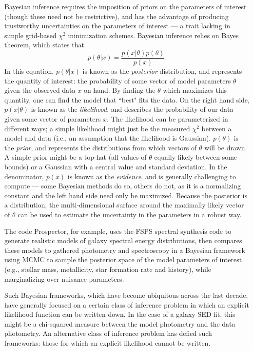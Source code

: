 \documentclass[twocolumn]{aastex631}
\begin{document}
Bayesian inference requires the imposition of priors on the parameters of interest (though these need not be restrictive), and has the advantage of producing trustworthy uncertainties on the parameters of interest --- a trait lacking in simple grid-based $\chi^2$ minimization schemes. Bayesian inference relies on Bayes theorem, which states that 
\begin{equation}\label{bayes}
    p(\theta|x) = \frac{p(x|\theta)p(\theta)}{p(x)}.
\end{equation}
In this equation, $p(\theta|x)$ is known as the \textit{posterior} distribution, and represents the quantity of interest: the probability of some vector of model parameters $\theta$ given the observed data $x$ on hand. By finding the $\theta$ which maximizes this quantity, one can find the model that ``best" fits the data. On the right hand side, $p(x|\theta)$ is known as the \textit{likelihood}, and describes the probability of our data given some vector of parameters $x$. The likelihood can be parameterized in different ways; a simple likelihood might just be the measured $\chi^2$ between a model and data (i.e., an assumption that the likelihood is Gaussian). $p(\theta)$ is the \textit{prior}, and represents the distributions from which vectors of $\theta$ will be drawn. A simple prior might be a top-hat (all values of $\theta$ equally likely between some bounds) or a Gaussian with a central value and standard deviation. In the denominator, $p(x)$ is known as the \textit{evidence}, and is generally challenging to compute --- some Bayesian methods do so, others do not, as it is a normalizing constant and the left hand side need only be maximized. Because the posterior is a distribution, the multi-dimensional surface around the maximally likely vector of $\theta$ can be used to estimate the uncertainty in the parameters in a robust way. 

The code Prospector, for example, uses the FSPS spectral synthesis code to generate realistic models of galaxy spectral energy distributions, then compares these models to gathered photometry and spectroscopy in a Bayesian framework using MCMC to sample the posterior space of the model parameters of interest (e.g., stellar mass, metallicity, star formation rate and history), while marginalizing over nuisance parameters. 

Such Bayesian frameworks, which have become ubiquitous across the last decade, have generally focused on a certain class of inference problem in which an explicit likelihood function can be written down. In the case of a galaxy SED fit, this might be a chi-squared measure between the model photometry and the data photometry. An alternative class of inference problem has defied such frameworks: those for which an explicit likelihood cannot be written. 
\end{document}
